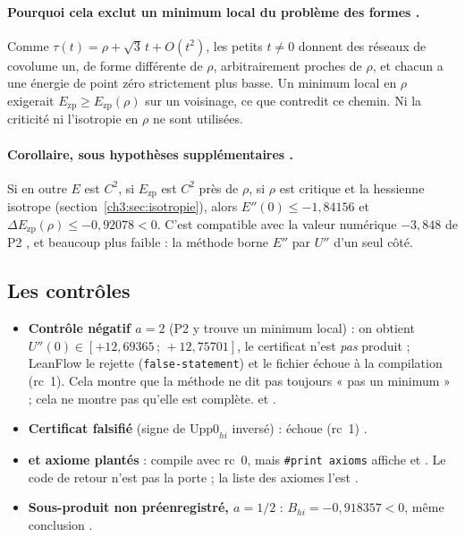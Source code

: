 \paragraph{Pourquoi cela exclut un minimum local du problème des formes \tierC.} Comme $\tau(t)=\rho+\sqrt3\,t+O(t^2)$,
les petits $t\ne0$ donnent des réseaux de covolume un, de forme différente de $\rho$, arbitrairement proches de $\rho$,
et chacun a une énergie de point zéro strictement plus basse. Un minimum local en $\rho$ exigerait
$E_{\mathrm{zp}}\ge E_{\mathrm{zp}}(\rho)$ sur un voisinage, ce que contredit ce chemin. Ni la criticité ni l'isotropie
en $\rho$ ne sont utilisées.

\paragraph{Corollaire, sous hypothèses supplémentaires \tierC.} Si en outre $E$ est $C^2$, si $E_{\mathrm{zp}}$ est $C^2$
près de $\rho$, si $\rho$ est critique et la hessienne isotrope (section~\ref{ch3:sec:isotropie}), alors
$E''(0)\le-1{,}84156$ et $\Delta E_{\mathrm{zp}}(\rho)\le-0{,}92078<0$. C'est compatible avec la valeur numérique
$-3{,}848$ de P2 \tierX, et beaucoup plus faible : la méthode borne $E''$ par $U''$ d'un seul côté.

\subsection{Les contrôles}\label{ch3:sec:controlesb2}
\begin{itemize}
\item \textbf{Contrôle négatif $a=2$} (P2 y trouve un minimum local) : on obtient $U''(0)\in[+12{,}69365\,;\,+12{,}75701]$, le
certificat n'est \emph{pas} produit ; LeanFlow le rejette (\texttt{false-statement}) et le fichier 
échoue à la compilation (rc~1). Cela montre que la méthode ne dit pas toujours « pas un minimum » ; cela ne montre pas
qu'elle est complète. \tierC{} et \tierAs.
\item \textbf{Certificat falsifié} (signe de $\mathrm{Upp0}_{hi}$ inversé) :  échoue (rc~1) \tierAs.
\item \textbf{ et axiome plantés} :  compile avec rc~0, mais \texttt{\#print axioms}
affiche  et . Le code de retour n'est pas la porte ; la liste des axiomes
l'est \tierAs.
\item \textbf{Sous-produit non préenregistré, $a=1/2$} : $B_{hi}=-0{,}918357<0$, même conclusion \tierC.
\end{itemize}

